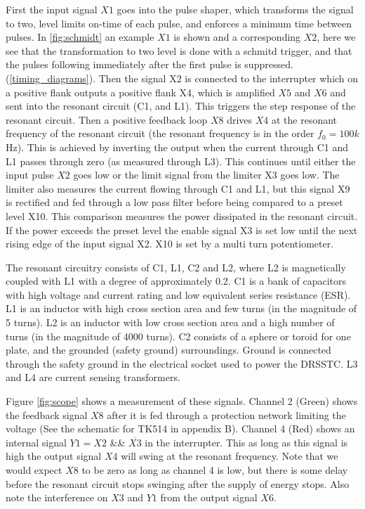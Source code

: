 First the input signal $X1$ goes into the pulse shaper, which transforms the signal to two, level limits on-time of each pulse, and enforces a minimum time between pulses. In \cref{fig:schmidt} an example $X1$ is shown and a corresponding $X2$, here we see that the transformation to two level is done with a schmitd trigger, and that the pulses following immediately after the first pulse is suppressed. (\cref{timing_diagrams}). Then the signal X2 is connected to the interrupter which on a positive flank outputs a positive flank X4, which is amplified $X5$ and $X6$ and sent into the resonant circuit (C1, and L1). This triggers the step response of the resonant circuit. Then a positive feedback loop $X8$ drives $X4$ at the resonant frequency of the resonant circuit (the resonant frequency is in the order $f_0 = 100k$Hz). This is achieved by inverting the output when the current through C1 and L1 passes through zero (as measured through L3). This continues until either the input pulse $X2$ goes low or the limit signal from the limiter X3 goes low.
The limiter also measures the current flowing through C1 and L1, but this signal X9 is rectified and fed through a low pass filter before being compared to a preset level X10. This comparison measures the power dissipated in the resonant circuit. If the power exceeds the preset level the enable signal X3 is set low until the next rising edge of the input signal X2. X10 is set by a multi turn potentiometer.

The resonant circuitry consists of C1, L1, C2 and L2, where L2 is magnetically coupled with L1 with a degree of approximately 0.2. C1 is a bank of capacitors with high voltage and current rating and low equivalent series resistance (ESR). L1 is an inductor with high cross section area and few turns (in the magnitude of 5 turns). L2 is an inductor with low cross section area and a high number of turns (in the magnitude of 4000 turns). C2 consists of a sphere or toroid for one plate, and the grounded (safety ground) surroundings. Ground is connected through the safety ground in the electrical socket used to power the DRSSTC. L3 and L4 are current sensing transformers.

Figure \cref{fig:scope} shows a measurement of these signals. Channel 2 (Green) shows the feedback signal $X8$ after it is fed through a protection network limiting the voltage (See the schematic for TK514 in appendix B). Channel 4 (Red) shows an internal signal $Y1 = X2$ \&\& $\overline{X3}$ in the interrupter. This as long as this signal is high the output signal $X4$ will swing at the resonant frequency. Note that we would expect $X8$ to be zero as long as channel 4 is low, but there is some delay before the resonant circuit stops swinging after the supply of energy stops. Also note the interference on $X3$ and $Y1$ from the output signal $X6$.

